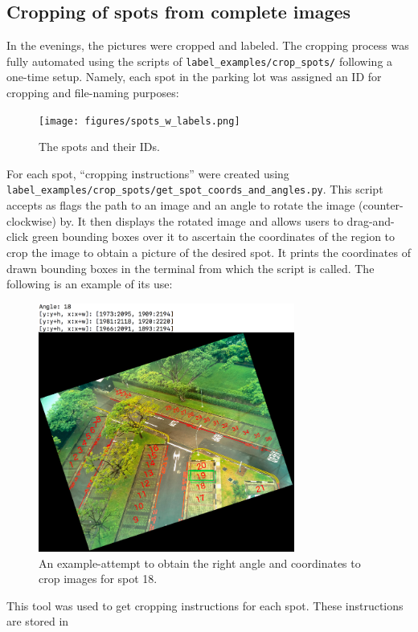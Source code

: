 \documentclass[a4paper, 11pt]{article} %
\begin{document}
	\subsection{Cropping of spots from complete images}
		In the evenings, the pictures were cropped and labeled. The cropping process was 
		fully automated	using the scripts of \texttt{label\_examples/crop\_spots/} 
		following a one-time setup. 
		Namely, each spot in the parking lot was assigned an ID for cropping and file-naming purposes:
		\begin{figure}[H]
			\centering
			\texttt{[image: figures/spots\_w\_labels.png]}
			\caption{The spots and their IDs.}
		\end{figure}
		For each spot, ``cropping instructions'' were created using\\
		\texttt{label\_examples/crop\_spots/get\_spot\_coords\_and\_angles.py}. This script accepts as flags
		the path to an image and an angle to rotate the image (counter-clockwise) by. It then displays the
		rotated image and allows users to drag-and-click green bounding boxes over it to ascertain the coordinates
		of the region to crop the image to obtain a picture of the desired spot. It prints the coordinates of drawn
		bounding boxes in the terminal from which the script is called. The following is an example of its use:
		\begin{figure}[H]
			\centering
			\includegraphics[width=0.75\textwidth]{figures/spot_coord_demo}
			\caption{An example-attempt to obtain the right angle and coordinates to crop images for spot 18.}
		\end{figure}
		This tool was used to get cropping instructions for each spot. These instructions are stored in
\end{document}
